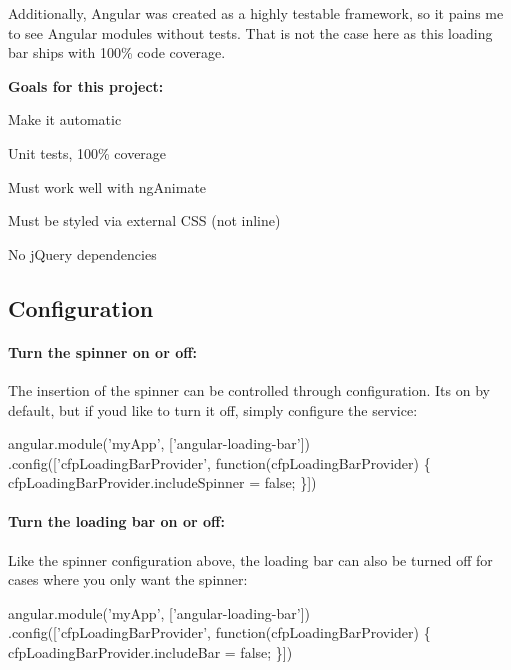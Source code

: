 Additionally, Angular was created as a highly testable framework, so it pains me to see Angular modules without tests. That is not the case here as this loading bar ships with 100\% code coverage.

{\bfseries Goals for this project\+:}


\begin{DoxyEnumerate}
\item Make it automatic
\item Unit tests, 100\% coverage
\item Must work well with ng\+Animate
\item Must be styled via external C\+SS (not inline)
\item No j\+Query dependencies
\end{DoxyEnumerate}

\subsection*{Configuration}

\paragraph*{Turn the spinner on or off\+:}

The insertion of the spinner can be controlled through configuration. It\textquotesingle{}s on by default, but if you\textquotesingle{}d like to turn it off, simply configure the service\+:


\begin{DoxyCode}
angular.module('myApp', ['angular-loading-bar'])
  .config(['cfpLoadingBarProvider', function(cfpLoadingBarProvider) \{
    cfpLoadingBarProvider.includeSpinner = false;
  \}])
\end{DoxyCode}


\paragraph*{Turn the loading bar on or off\+:}

Like the spinner configuration above, the loading bar can also be turned off for cases where you only want the spinner\+:


\begin{DoxyCode}
angular.module('myApp', ['angular-loading-bar'])
  .config(['cfpLoadingBarProvider', function(cfpLoadingBarProvider) \{
    cfpLoadingBarProvider.includeBar = false;
  \}])
\end{DoxyCode}


